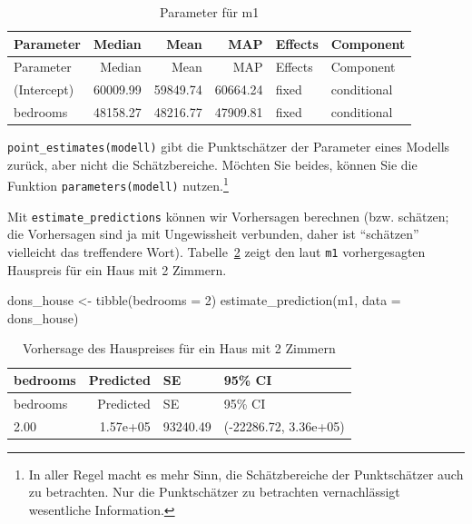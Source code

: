 \documentclass[
  a4paper,
  DIV=11]{scrreprt}
\newenvironment{Shaded}{\begin{snugshade}}{\end{snugshade}}
\newcommand{\AttributeTok}[1]{\textcolor[rgb]{0.40,0.45,0.13}{#1}}
\newcommand{\DecValTok}[1]{\textcolor[rgb]{0.68,0.00,0.00}{#1}}
\newcommand{\FunctionTok}[1]{\textcolor[rgb]{0.28,0.35,0.67}{#1}}
\newcommand{\NormalTok}[1]{\textcolor[rgb]{0.00,0.23,0.31}{#1}}
\newcommand{\OtherTok}[1]{\textcolor[rgb]{0.00,0.23,0.31}{#1}}
\theoremstyle{definition}
\theoremstyle{remark}
\begin{document}
\hypertarget{tbl-m1-hdi}{}
\begin{longtable}[]{@{}lrrrll@{}}
\caption{\label{tbl-m1-hdi}Parameter für m1}\tabularnewline
\toprule()
Parameter & Median & Mean & MAP & Effects & Component \\
\midrule()
\endfirsthead
\toprule()
Parameter & Median & Mean & MAP & Effects & Component \\
\midrule()
\endhead
(Intercept) & 60009.99 & 59849.74 & 60664.24 & fixed & conditional \\
bedrooms & 48158.27 & 48216.77 & 47909.81 & fixed & conditional \\
\bottomrule()
\end{longtable}

\texttt{point\_estimates(modell)} gibt die Punktschätzer der Parameter
eines Modells zurück, aber nicht die Schätzbereiche. Möchten Sie beides,
können Sie die Funktion \texttt{parameters(modell)} nutzen.\footnote{In
  aller Regel macht es mehr Sinn, die Schätzbereiche der Punktschätzer
  auch zu betrachten. Nur die Punktschätzer zu betrachten vernachlässigt
  wesentliche Information.}

Mit \texttt{estimate\_predictions} können wir Vorhersagen berechnen
(bzw. schätzen; die Vorhersagen sind ja mit Ungewissheit verbunden,
daher ist ``schätzen'' vielleicht das treffendere Wort).
Tabelle~\ref{tbl-m1-pred} zeigt den laut \texttt{m1} vorhergesagten
Hauspreis für ein Haus mit 2 Zimmern.

\begin{Shaded}
\begin{Highlighting}[]
\NormalTok{dons\_house }\OtherTok{\textless{}{-}} \FunctionTok{tibble}\NormalTok{(}\AttributeTok{bedrooms =} \DecValTok{2}\NormalTok{)}
\FunctionTok{estimate\_prediction}\NormalTok{(m1, }\AttributeTok{data =}\NormalTok{ dons\_house)}
\end{Highlighting}
\end{Shaded}

\hypertarget{tbl-m1-pred}{}
\begin{longtable}[]{@{}lrll@{}}
\caption{\label{tbl-m1-pred}Vorhersage des Hauspreises für ein Haus mit
2 Zimmern}\tabularnewline
\toprule()
bedrooms & Predicted & SE & 95\% CI \\
\midrule()
\endfirsthead
\toprule()
bedrooms & Predicted & SE & 95\% CI \\
\midrule()
\endhead
2.00 & 1.57e+05 & 93240.49 & (-22286.72, 3.36e+05) \\
\bottomrule()
\end{longtable}
\end{document}
